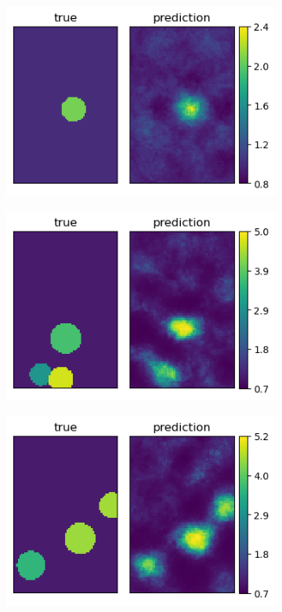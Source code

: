 \documentclass[12pt]{article}
\newcommand{\nhghalfwidth}{0.48\linewidth}
\newcommand{\nhgtotalheight}{4cm}
\begin{document}
%
\begin{figure}[!h]
  \centering
  \begin{subfigure}[c]{\nhghalfwidth}
    \centering
    \includegraphics[totalheight=\nhgtotalheight]{Figures/Results2/ex1/mu.png}
  \end{subfigure}
  \begin{subfigure}[c]{\nhghalfwidth}
    \centering
    \includegraphics[totalheight=\nhgtotalheight]{Figures/Results2/ex2/mu.png}
  \end{subfigure}
  \begin{subfigure}[c]{\nhghalfwidth}
    \centering
    \includegraphics[totalheight=\nhgtotalheight]{Figures/Results2/ex3/mu.png}

\end{subfigure}
\end{figure}
\end{document}
